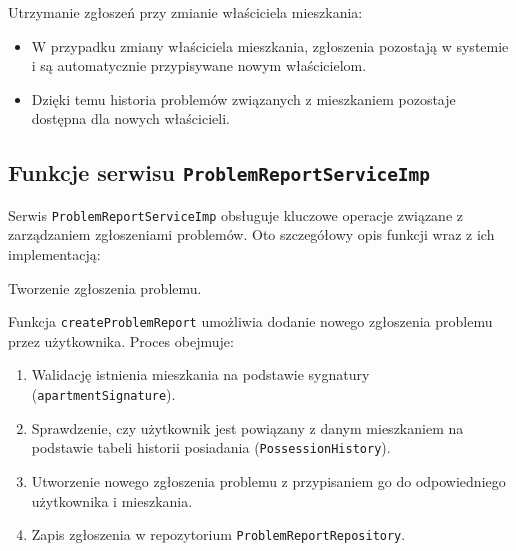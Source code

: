 Utrzymanie zgłoszeń przy zmianie właściciela mieszkania:
\begin{itemize}
    \item W przypadku zmiany właściciela mieszkania, zgłoszenia pozostają w systemie i są automatycznie przypisywane nowym właścicielom.
    \item Dzięki temu historia problemów związanych z mieszkaniem pozostaje dostępna dla nowych właścicieli.
\end{itemize}


\subsection{Funkcje serwisu \texttt{ProblemReportServiceImp}}

Serwis \texttt{ProblemReportServiceImp} obsługuje kluczowe operacje związane z zarządzaniem zgłoszeniami problemów. Oto szczegółowy opis funkcji wraz z ich implementacją:

Tworzenie zgłoszenia problemu.

Funkcja \texttt{createProblemReport} umożliwia dodanie nowego zgłoszenia problemu przez użytkownika. Proces obejmuje:
\begin{enumerate}
    \item Walidację istnienia mieszkania na podstawie sygnatury (\texttt{apartmentSignature}).
    \item Sprawdzenie, czy użytkownik jest powiązany z danym mieszkaniem na podstawie tabeli historii posiadania (\texttt{PossessionHistory}).
    \item Utworzenie nowego zgłoszenia problemu z przypisaniem go do odpowiedniego użytkownika i mieszkania.
    \item Zapis zgłoszenia w repozytorium \texttt{ProblemReportRepository}.
\end{enumerate}

